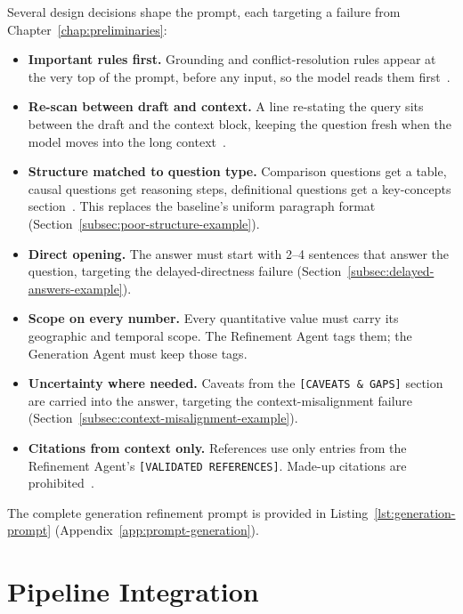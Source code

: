 Several design decisions shape the prompt, each targeting a failure from Chapter~\ref{chap:preliminaries}:

\begin{itemize}
\item \textbf{Important rules first.} Grounding and conflict-resolution rules appear at the very top of the prompt, before any input, so the model reads them first~\citep{liu2024lost}.
\item \textbf{Re-scan between draft and context.} A line re-stating the query sits between the draft and the context block, keeping the question fresh when the model moves into the long context~\citep{liu2024lost}.
\item \textbf{Structure matched to question type.} Comparison questions get a table, causal questions get reasoning steps, definitional questions get a key-concepts section~\citep{wei2022chain}. This replaces the baseline's uniform paragraph format (Section~\ref{subsec:poor-structure-example}).
\item \textbf{Direct opening.} The answer must start with 2--4 sentences that answer the question, targeting the delayed-directness failure (Section~\ref{subsec:delayed-answers-example}).
\item \textbf{Scope on every number.} Every quantitative value must carry its geographic and temporal scope. The Refinement Agent tags them; the Generation Agent must keep those tags.
\item \textbf{Uncertainty where needed.} Caveats from the \texttt{[CAVEATS \& GAPS]} section are carried into the answer, targeting the context-misalignment failure (Section~\ref{subsec:context-misalignment-example}).
\item \textbf{Citations from context only.} References use only entries from the Refinement Agent's \texttt{[VALIDATED REFERENCES]}. Made-up citations are prohibited~\citep{lewis2020retrieval}.
\end{itemize}

The complete generation refinement prompt is provided in Listing~\ref{lst:generation-prompt} (Appendix~\ref{app:prompt-generation}).

\section{Pipeline Integration}
\label{sec:pipeline-integration}

